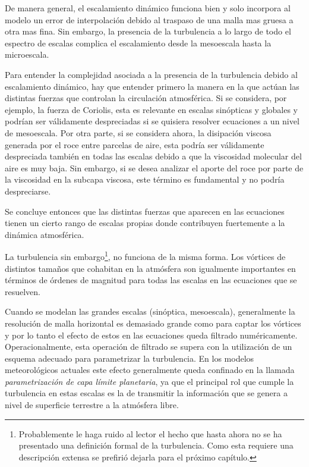 De manera general, el escalamiento dinámico funciona bien y solo incorpora al modelo un error de interpolación debido al traspaso de una malla mas gruesa a otra mas fina. Sin embargo, la presencia de la turbulencia a lo largo de todo el espectro de escalas complica el escalamiento desde la mesoescala hasta la microescala.

Para entender la complejidad asociada a la presencia de la turbulencia debido al escalamiento dinámico, hay que entender primero la manera en la que actúan las distintas fuerzas que controlan la circulación atmosférica. Si se considera, por ejemplo, la fuerza de Coriolis, %
esta es relevante en escalas sinópticas y globales y  podrían ser válidamente despreciadas si se quisiera resolver ecuaciones a un nivel de mesoescala. Por otra parte, si se considera ahora, la disipación viscosa generada por el roce entre parcelas de aire, esta podría ser válidamente despreciada también en todas las escalas debido a que la viscosidad molecular del aire es muy baja. Sin embargo, si se desea analizar el aporte del roce por parte de la viscosidad en la subcapa viscosa, este término es fundamental y no podría despreciarse. 

Se concluye entonces que las distintas fuerzas que aparecen en las ecuaciones tienen un cierto rango de escalas propias donde contribuyen fuertemente a la dinámica atmosférica. 

La turbulencia sin embargo\footnote{Probablemente le haga ruido al lector el hecho que hasta ahora no se ha presentado una definición formal de la turbulencia. Como esta requiere una descripción extensa se prefirió dejarla para el próximo capítulo.}, no funciona de la misma forma. Los vórtices de distintos tamaños que cohabitan en la atmósfera son igualmente importantes en términos de órdenes de magnitud para todas las escalas en las ecuaciones que se resuelven.

Cuando se modelan las grandes escalas (sinóptica, mesoescala), generalmente la resolución de malla horizontal es demasiado grande como para captar los vórtices y por lo tanto el efecto de estos en las ecuaciones queda filtrado numéricamente. Operacionalmente, esta operación de filtrado se supera con la utilización de un esquema adecuado para parametrizar la turbulencia. En los modelos meteorológicos actuales este efecto generalmente queda confinado en la llamada \emph{parametrización de capa límite planetaria}, ya que el principal rol que cumple la turbulencia en estas escalas es la de transmitir la información que se genera a nivel de superficie terrestre a la atmósfera libre.

